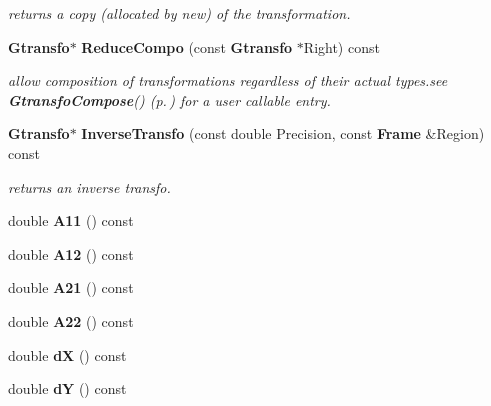 \begin{CompactItemize}
\begin{CompactList}\small\item\em returns a copy (allocated by new) of the transformation.\item\end{CompactList}\item 
{}
{\bf Gtransfo}$\ast$ {\bf Reduce\-Compo} (const {\bf Gtransfo} $\ast$Right) const\label{class_gtransfolin_a13}

\begin{CompactList}\small\item\em allow composition of transformations regardless of their actual types.see {\bf Gtransfo\-Compose}() {\rm (p.\,\pageref{gtransfo_h_a1})} for a user callable entry.\item\end{CompactList}\item 
{\bf Gtransfo}$\ast$ {\bf Inverse\-Transfo} (const double Precision, const {\bf Frame} \&Region) const
\begin{CompactList}\small\item\em returns an inverse transfo.\item\end{CompactList}\item 
{}
double {\bf A11} () const\label{class_gtransfolin_a15}

\item 
{}
double {\bf A12} () const\label{class_gtransfolin_a16}

\item 
{}
double {\bf A21} () const\label{class_gtransfolin_a17}

\item 
{}
double {\bf A22} () const\label{class_gtransfolin_a18}

\item 
{}
double {\bf d\-X} () const\label{class_gtransfolin_a19}

\item 
{}
double {\bf d\-Y} () const\label{class_gtransfolin_a20}


\end{CompactItemize}

